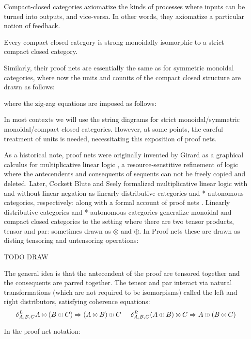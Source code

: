 Compact-closed categories axiomatize the kinds of processes where inputs can be turned into outputs, and vice-versa.  In other words, they axiomatize a particular notion of feedback.

\begin{theorem}
Every compact closed category is strong-monoidally isomorphic to a strict compact closed category. 
\end{theorem}

Similarly, their proof nets are essentially the same as for symmetric monoidal categories, where now the units and counits of the compact closed structure are drawn as follows:

where the zig-zag equations are imposed as follows:


In most contexts we will use the string diagrams for strict monoidal/symmetric monoidal/compact closed categories.  However, at some points, the careful treatment of units is needed, necessitating this exposition of proof nets. 

As a historical note, proof nets were originally invented by Girard as a graphical calculus for multiplicative linear logic \cite{???}, a resource-senstitive refinement of logic where the antecendents and consequents of sequents can not be freely copied and deleted.  Later, Cockett Blute and Seely formalized multiplicative linear logic with and without linear negation as linearly distributive categories and *-autonomous categories, respectively: along with a formal account of proof nets \cite{???}. Linearly distributive categories and *-autonomous categories generalize monoidal and compact closed categories to the setting where there are two tensor products, tensor and par: sometimes drawn as $\otimes$ and $\oplus$.  In Proof nets these are drawn as disting tensoring and untensoring operations:

TODO DRAW 




  The general idea is that the antecendent of the proof are tensored together and the consequents are parred together. The tensor and par interact via natural transformations (which are not required to be isomorpisms) called the  left and right distributors, satisfying coherence equations:
$$
\delta_{A,B,C}^L A \otimes (B\oplus C) \Rightarrow (A\otimes B)\oplus C
\hspace*{.5cm}
\delta_{A,B,C}^R (A\oplus B) \otimes C \Rightarrow A\oplus (B \otimes C)
$$

In the proof net notation:

